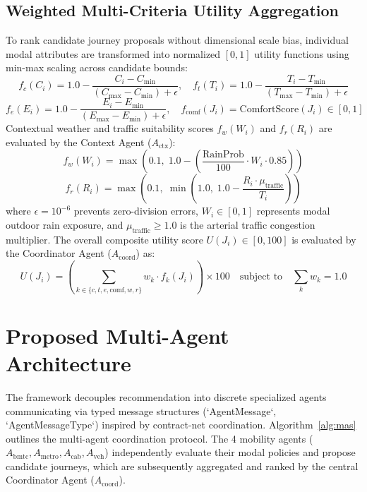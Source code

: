 \documentclass[runningheads]{llncs}
\begin{document}
\subsection{Weighted Multi-Criteria Utility Aggregation}
To rank candidate journey proposals without dimensional scale bias, individual modal attributes are transformed into normalized $[0, 1]$ utility functions using min-max scaling across candidate bounds:
\begin{equation}
f_c(C_i) = 1.0 - \frac{C_i - C_{\min}}{(C_{\max} - C_{\min}) + \epsilon}, \quad f_t(T_i) = 1.0 - \frac{T_i - T_{\min}}{(T_{\max} - T_{\min}) + \epsilon}
\end{equation}
\begin{equation}
f_e(E_i) = 1.0 - \frac{E_i - E_{\min}}{(E_{\max} - E_{\min}) + \epsilon}, \quad f_{\text{comf}}(J_i) = \text{ComfortScore}(J_i) \in [0, 1]
\end{equation}
Contextual weather and traffic suitability scores $f_w(W_i)$ and $f_r(R_i)$ are evaluated by the Context Agent ($A_{\text{ctx}}$):
\begin{equation}
f_w(W_i) = \max \left( 0.1, \; 1.0 - \left( \frac{\text{RainProb}}{100} \cdot W_i \cdot 0.85 \right) \right)
\end{equation}
\begin{equation}
f_r(R_i) = \max \left( 0.1, \; \min \left( 1.0, \; 1.0 - \frac{R_i \cdot \mu_{\text{traffic}}}{T_i} \right) \right)
\end{equation}
where $\epsilon = 10^{-6}$ prevents zero-division errors, $W_i \in [0, 1]$ represents modal outdoor rain exposure, and $\mu_{\text{traffic}} \ge 1.0$ is the arterial traffic congestion multiplier. The overall composite utility score $U(J_i) \in [0, 100]$ is evaluated by the Coordinator Agent ($A_{\text{coord}}$) as:
\begin{equation}
U(J_i) = \left( \sum_{k \in \{c, t, e, \text{comf}, w, r\}} w_k \cdot f_k(J_i) \right) \times 100 \quad \text{subject to} \quad \sum_{k} w_k = 1.0
\end{equation}


\section{Proposed Multi-Agent Architecture}
\label{sec:architecture}

The framework decouples recommendation into discrete specialized agents communicating via typed message structures (`AgentMessage`, `AgentMessageType`) inspired by contract-net coordination. Algorithm~\ref{alg:mas} outlines the multi-agent coordination protocol. The 4 mobility agents ($A_{\text{bmtc}}, A_{\text{metro}}, A_{\text{cab}}, A_{\text{veh}}$) independently evaluate their modal policies and propose candidate journeys, which are subsequently aggregated and ranked by the central Coordinator Agent ($A_{\text{coord}}$).
\end{document}

